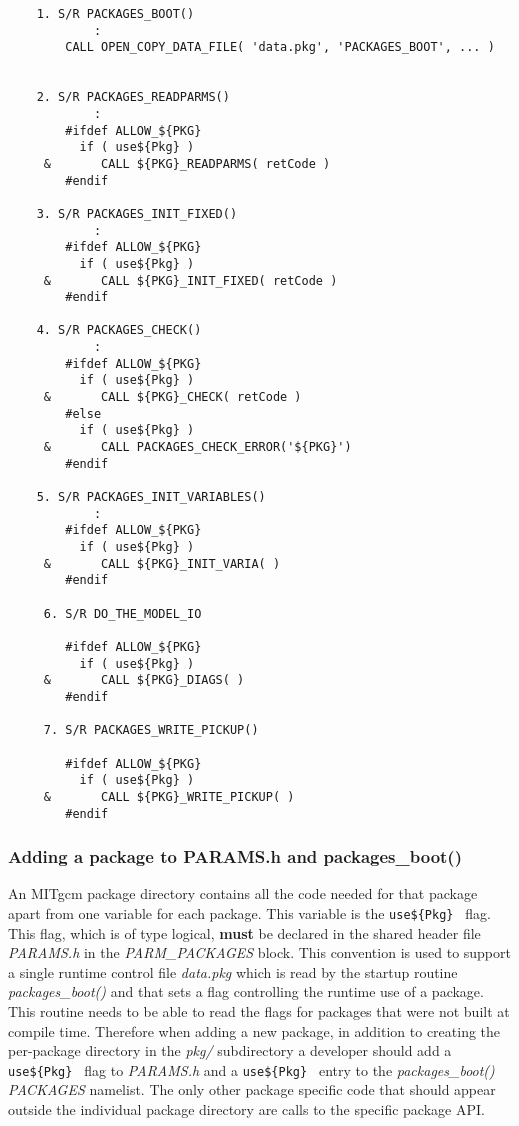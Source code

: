 {\footnotesize
\begin{verbatim}
    1. S/R PACKAGES_BOOT()
            :
        CALL OPEN_COPY_DATA_FILE( 'data.pkg', 'PACKAGES_BOOT', ... )
 

    2. S/R PACKAGES_READPARMS()
            :
        #ifdef ALLOW_${PKG}
          if ( use${Pkg} )
     &       CALL ${PKG}_READPARMS( retCode )
        #endif

    3. S/R PACKAGES_INIT_FIXED()
            :
        #ifdef ALLOW_${PKG}
          if ( use${Pkg} )
     &       CALL ${PKG}_INIT_FIXED( retCode )
        #endif

    4. S/R PACKAGES_CHECK()
            :
        #ifdef ALLOW_${PKG}
          if ( use${Pkg} )
     &       CALL ${PKG}_CHECK( retCode )
        #else
          if ( use${Pkg} )
     &       CALL PACKAGES_CHECK_ERROR('${PKG}')
        #endif

    5. S/R PACKAGES_INIT_VARIABLES()
            :
        #ifdef ALLOW_${PKG}
          if ( use${Pkg} )
     &       CALL ${PKG}_INIT_VARIA( )
        #endif

     6. S/R DO_THE_MODEL_IO

        #ifdef ALLOW_${PKG}
          if ( use${Pkg} )
     &       CALL ${PKG}_DIAGS( )
        #endif

     7. S/R PACKAGES_WRITE_PICKUP()

        #ifdef ALLOW_${PKG}
          if ( use${Pkg} )
     &       CALL ${PKG}_WRITE_PICKUP( )
        #endif\end{verbatim}
}


\subsubsection{Adding a package to PARAMS.h and  packages\_boot()}

An MITgcm package directory contains all the code needed for that package apart
from one variable for each package. This variable is the {\tt use\$\{Pkg\} } 
flag. This flag, which is of type logical, {\bf must} be declared in the 
shared header file {\it PARAMS.h} in the {\it PARM\_PACKAGES} block. This 
convention is used to support a single runtime control file {\it data.pkg} 
which is read by the startup routine {\it packages\_boot()} and that sets a 
flag controlling the runtime use of a package. This routine needs to be able to 
read the flags for packages that were not built at compile time. Therefore
when adding a new package, in addition to creating the per-package directory
in the {\it pkg/} subdirectory a developer should add a {\tt use\$\{Pkg\} }
flag to {\it PARAMS.h} and a {\tt use\$\{Pkg\} } entry to the 
{\it packages\_boot()} {\it PACKAGES} namelist.
The only other package specific code that should appear outside the individual 
package directory are calls to the specific package API.



